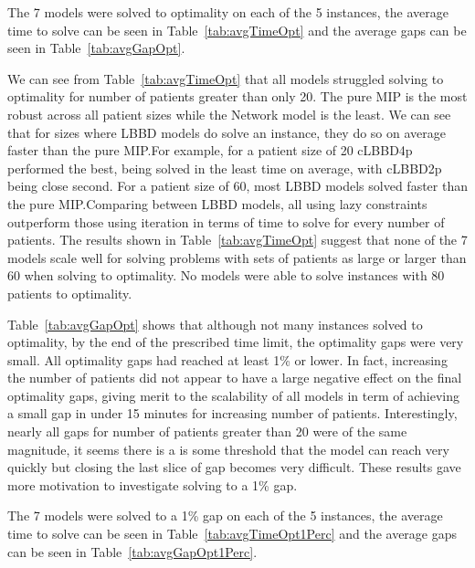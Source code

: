 The 7 models were solved to optimality on each of the 5 instances, the average time to solve can be seen in Table~\ref{tab:avgTimeOpt} and the average gaps can be seen in Table~\ref{tab:avgGapOpt}.



We can see from Table~\ref{tab:avgTimeOpt} that all models struggled solving to optimality for number of patients greater than only 20. The pure MIP is the most robust across all patient sizes while the Network model is the least. We can see that for sizes where LBBD models do solve an instance, they do so on average faster than the pure MIP.\@ For example, for a patient size of 20 cLBBD4p performed the best, being solved in the least time on average, with cLBBD2p being close second. For a patient size of 60, most LBBD models solved faster than the pure MIP.\@ Comparing between LBBD models, all using lazy constraints outperform those using iteration in terms of time to solve for every number of patients. The results shown in Table~\ref{tab:avgTimeOpt} suggest that none of the 7 models scale well for solving problems with sets of patients as large or larger than 60 when solving to optimality. No models were able to solve instances with 80 patients to optimality. 



Table~\ref{tab:avgGapOpt} shows that although not many instances solved to optimality, by the end of the prescribed time limit, the optimality gaps were very small. All optimality gaps had reached at least 1\% or lower. In fact, increasing the number of patients did not appear to have a large negative effect on the final optimality gaps, giving merit to the scalability of all models in term of achieving a small gap in under 15 minutes for increasing number of patients. Interestingly, nearly all gaps for number of patients greater than 20 were of the same magnitude, it seems there is a is some threshold that the model can reach very quickly but closing the last slice of gap becomes very difficult. These results gave more motivation to investigate solving to a 1\% gap.

The 7 models were solved to a 1\% gap on each of the 5 instances, the average time to solve can be seen in Table~\ref{tab:avgTimeOpt1Perc} and the average gaps can be seen in Table~\ref{tab:avgGapOpt1Perc}.



%  

